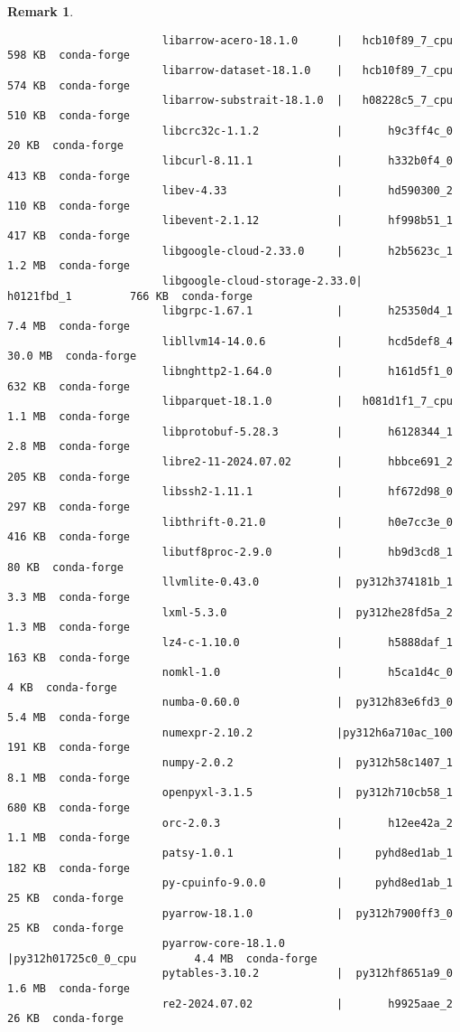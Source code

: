\documentclass{article}
\newtheorem{remark}{Remark}
\begin{document}
\begin{enumerate}
\begin{itemize}
\begin{itemize}
\begin{itemize}
\begin{remark}
\begin{verbatim}
						libarrow-acero-18.1.0      |   hcb10f89_7_cpu         598 KB  conda-forge
						libarrow-dataset-18.1.0    |   hcb10f89_7_cpu         574 KB  conda-forge
						libarrow-substrait-18.1.0  |   h08228c5_7_cpu         510 KB  conda-forge
						libcrc32c-1.1.2            |       h9c3ff4c_0          20 KB  conda-forge
						libcurl-8.11.1             |       h332b0f4_0         413 KB  conda-forge
						libev-4.33                 |       hd590300_2         110 KB  conda-forge
						libevent-2.1.12            |       hf998b51_1         417 KB  conda-forge
						libgoogle-cloud-2.33.0     |       h2b5623c_1         1.2 MB  conda-forge
						libgoogle-cloud-storage-2.33.0|       h0121fbd_1         766 KB  conda-forge
						libgrpc-1.67.1             |       h25350d4_1         7.4 MB  conda-forge
						libllvm14-14.0.6           |       hcd5def8_4        30.0 MB  conda-forge
						libnghttp2-1.64.0          |       h161d5f1_0         632 KB  conda-forge
						libparquet-18.1.0          |   h081d1f1_7_cpu         1.1 MB  conda-forge
						libprotobuf-5.28.3         |       h6128344_1         2.8 MB  conda-forge
						libre2-11-2024.07.02       |       hbbce691_2         205 KB  conda-forge
						libssh2-1.11.1             |       hf672d98_0         297 KB  conda-forge
						libthrift-0.21.0           |       h0e7cc3e_0         416 KB  conda-forge
						libutf8proc-2.9.0          |       hb9d3cd8_1          80 KB  conda-forge
						llvmlite-0.43.0            |  py312h374181b_1         3.3 MB  conda-forge
						lxml-5.3.0                 |  py312he28fd5a_2         1.3 MB  conda-forge
						lz4-c-1.10.0               |       h5888daf_1         163 KB  conda-forge
						nomkl-1.0                  |       h5ca1d4c_0           4 KB  conda-forge
						numba-0.60.0               |  py312h83e6fd3_0         5.4 MB  conda-forge
						numexpr-2.10.2             |py312h6a710ac_100         191 KB  conda-forge
						numpy-2.0.2                |  py312h58c1407_1         8.1 MB  conda-forge
						openpyxl-3.1.5             |  py312h710cb58_1         680 KB  conda-forge
						orc-2.0.3                  |       h12ee42a_2         1.1 MB  conda-forge
						patsy-1.0.1                |     pyhd8ed1ab_1         182 KB  conda-forge
						py-cpuinfo-9.0.0           |     pyhd8ed1ab_1          25 KB  conda-forge
						pyarrow-18.1.0             |  py312h7900ff3_0          25 KB  conda-forge
						pyarrow-core-18.1.0        |py312h01725c0_0_cpu         4.4 MB  conda-forge
						pytables-3.10.2            |  py312hf8651a9_0         1.6 MB  conda-forge
						re2-2024.07.02             |       h9925aae_2          26 KB  conda-forge

\end{verbatim}
\end{remark}
\end{itemize}
\end{itemize}
\end{itemize}
\end{enumerate}
\end{document}
